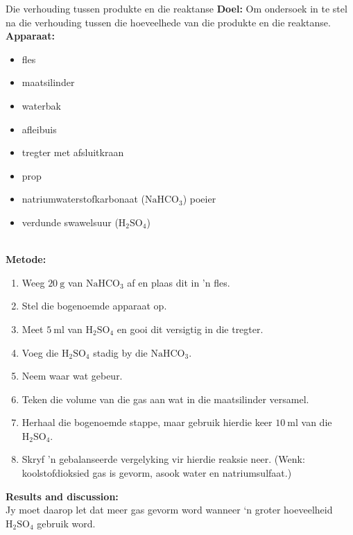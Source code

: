 \begin{g_experiment}{Die verhouding tussen produkte en die reaktanse}
\textbf{Doel:} Om ondersoek in te stel na die verhouding tussen die hoeveelhede van die produkte en die reaktanse.\\
\textbf{Apparaat:}\\
\begin{minipage}{.5\textwidth}
 \begin{itemize}[noitemsep]
  \item fles
\item maatsilinder
\item waterbak
\item afleibuis
\item tregter met afsluitkraan
\item prop
\item natriumwaterstofkarbonaat ($\text{NaHCO}_{3}$) poeier
\item verdunde swawelsuur ($\text{H}_{2}\text{SO}_{4}$)
 \end{itemize}
\end{minipage}
\begin{minipage}{.5\textwidth}
\begin{center}
\end{center}
\end{minipage} \\
\textbf{Metode:} 
\begin{enumerate}[noitemsep,label=\textbf{\arabic*}]
 \item Weeg $20~\text{g}$ van $\text{NaHCO}_{3}$ af en plaas dit in 'n fles.
\item Stel die bogenoemde apparaat op.
\item Meet $5~\text{ml}$ van $\text{H}_{2}\text{SO}_{4}$ en gooi dit versigtig in die tregter.
\item Voeg die $\text{H}_{2}\text{SO}_{4}$ stadig by die $\text{NaHCO}_{3}$.
\item Neem waar wat gebeur.
\item Teken die volume van die gas aan wat in die maatsilinder versamel.
\item Herhaal die bogenoemde stappe, maar gebruik hierdie keer $10~\text{ml}$ van die $\text{H}_{2}\text{SO}_{4}$.
\item Skryf 'n gebalanseerde vergelyking vir hierdie reaksie neer. (Wenk: koolstofdioksied gas is gevorm, asook water en natriumsulfaat.)
\end{enumerate}
\textbf{Results and discussion:}\\
Jy moet daarop let dat meer gas gevorm word wanneer ‘n groter hoeveelheid $\text{H}_{2}\text{SO}_{4}$ gebruik word. 
\end{g_experiment}

